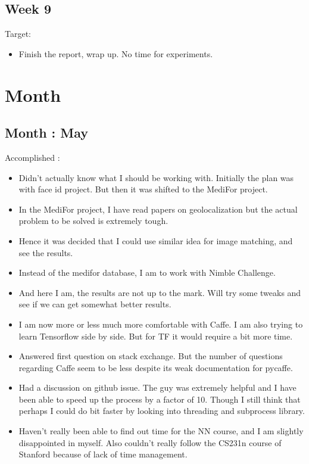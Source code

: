 \documentclass{article}
\begin{document}
\subsection{Week 9}
Target:
\begin{itemize}
\item Finish the report, wrap up. No time for experiments.
\end{itemize}
\section{Month}
\subsection{Month : May}
Accomplished :
\begin{itemize}
\item Didn't actually know what I should be working with. Initially the plan was with face id project. But then it was shifted to the MediFor project.
\item In the MediFor project, I have read papers on geolocalization but the actual problem to be solved is extremely tough.
\item Hence it was decided that I could use similar idea for image matching, and see the results.
\item Instead of the medifor database, I am to work with Nimble Challenge.
\item And here I am, the results are not up to the mark. Will try some tweaks and see if we can get somewhat better results.
\item I am now more or less much more comfortable with Caffe. I am also trying to learn Tensorflow side by side. But for TF it would require a bit more time.
\item Answered first question on stack exchange. But the number of questions regarding Caffe seem to be less despite its weak documentation for pycaffe.
\item Had a discussion on github issue. The guy was extremely helpful and I have been able to speed up the process by a factor of 10. Though I still think that perhaps I could do bit faster by looking into threading and subprocess library.
\item Haven't really been able to find out time for the NN course, and I am slightly disappointed in myself. Also couldn't really follow the CS231n course of Stanford because of lack of time management.
\end{itemize}
\end{document}
